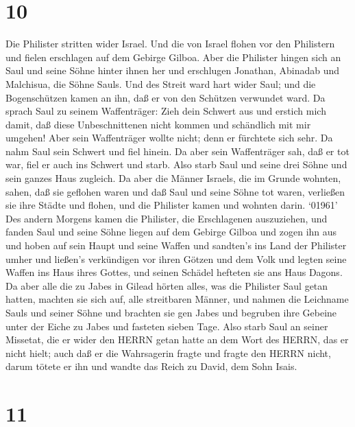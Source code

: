 \hypertarget{section-9}{%
\section{10}\label{section-9}}

 Die Philister stritten wider Israel. Und die von Israel
flohen vor den Philistern und fielen erschlagen auf dem Gebirge Gilboa.
 Aber die Philister hingen sich an Saul und seine Söhne
hinter ihnen her und erschlugen Jonathan, Abinadab und Malchisua, die
Söhne Sauls.  Und des Streit ward hart wider Saul; und die
Bogenschützen kamen an ihn, daß er von den Schützen verwundet ward.
 Da sprach Saul zu seinem Waffenträger: Zieh dein Schwert
aus und erstich mich damit, daß diese Unbeschnittenen nicht kommen und
schändlich mit mir umgehen! Aber sein Waffenträger wollte nicht; denn er
fürchtete sich sehr. Da nahm Saul sein Schwert und fiel hinein.
 Da aber sein Waffenträger sah, daß er tot war, fiel er auch
ins Schwert und starb.  Also starb Saul und seine drei Söhne
und sein ganzes Haus zugleich.  Da aber die Männer Israels,
die im Grunde wohnten, sahen, daß sie geflohen waren und daß Saul und
seine Söhne tot waren, verließen sie ihre Städte und flohen, und die
Philister kamen und wohnten darin.  `01961' Des andern
Morgens kamen die Philister, die Erschlagenen auszuziehen, und fanden
Saul und seine Söhne liegen auf dem Gebirge Gilboa  und
zogen ihn aus und hoben auf sein Haupt und seine Waffen und sandten's
ins Land der Philister umher und ließen's verkündigen vor ihren Götzen
und dem Volk  und legten seine Waffen ins Haus ihres
Gottes, und seinen Schädel hefteten sie ans Haus Dagons. 
Da aber alle die zu Jabes in Gilead hörten alles, was die Philister Saul
getan hatten,  machten sie sich auf, alle streitbaren
Männer, und nahmen die Leichname Sauls und seiner Söhne und brachten sie
gen Jabes und begruben ihre Gebeine unter der Eiche zu Jabes und
fasteten sieben Tage.  Also starb Saul an seiner Missetat,
die er wider den HERRN getan hatte an dem Wort des HERRN, das er nicht
hielt; auch daß er die Wahrsagerin fragte  und fragte den
HERRN nicht, darum tötete er ihn und wandte das Reich zu David, dem Sohn
Isais.

\hypertarget{section-10}{%
\section{11}\label{section-10}}

